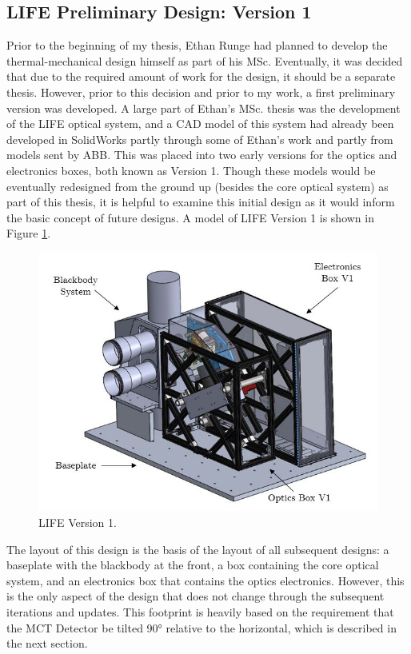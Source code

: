 \subsection{LIFE Preliminary Design: Version 1} %
Prior to the beginning of my thesis, Ethan Runge had planned to develop the thermal-mechanical design himself as part of his MSc. Eventually, it was decided that due to the required amount of work for the design, it should be a separate thesis. However, prior to this decision and prior to my work, a first preliminary version was developed. A large part of Ethan's MSc. thesis was the development of the LIFE optical system, and a CAD model of this system had already been developed in SolidWorks partly through some of Ethan's work and partly from models sent by ABB. This was placed into two early versions for the optics and electronics boxes, both known as Version 1. Though these models would be eventually redesigned from the ground up (besides the core optical system) as part of this thesis, it is helpful to examine this initial design as it would inform the basic concept of future designs. A model of LIFE Version 1 is shown in Figure \ref{fig:LIFE_V1}.

\begin{figure}[h]
    \centering
    \includegraphics[width=0.8\linewidth]{chap3_images/LIFE_V1_images/LIFE_V1_labelled.JPG}
    \caption{LIFE Version 1.}
    \label{fig:LIFE_V1}
\end{figure}

The layout of this design is the basis of the layout of all subsequent designs: a baseplate with the blackbody at the front, a box containing the core optical system, and an electronics box that contains the optics electronics. However, this is the only aspect of the design that does not change through the subsequent iterations and updates. This footprint is heavily based on the requirement that the MCT Detector be tilted 90° relative to the horizontal, which is described in the next section.

